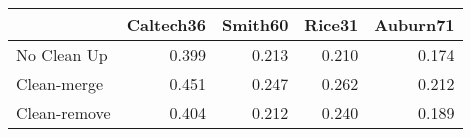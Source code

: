 \begin{tabular}{lrrrr}
\toprule
{} & Caltech36 & Smith60 & Rice31 & Auburn71 \\
\midrule
No Clean Up  &     0.399 &   0.213 &  0.210 &    0.174 \\
Clean-merge  &     0.451 &   0.247 &  0.262 &    0.212 \\
Clean-remove &     0.404 &   0.212 &  0.240 &    0.189 \\
\bottomrule
\end{tabular}
